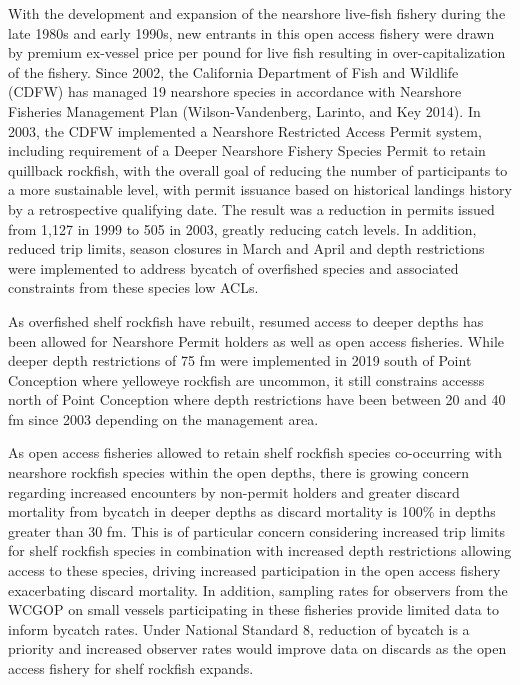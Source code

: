 \documentclass[11pt,
  english,
  a4paper,
]{article}
\begin{document}
With the development and expansion of the nearshore live-fish fishery during the late 1980s and early 1990s, new entrants in this open access fishery were drawn by premium ex-vessel price per pound for live fish resulting in over-capitalization of the fishery. Since 2002, the California Department of Fish and Wildlife (CDFW) has managed 19 nearshore species in accordance with Nearshore Fisheries Management Plan {(Wilson-Vandenberg, Larinto, and Key 2014)\leavevmode\tagmcend\tagstructend}. In 2003, the CDFW implemented a Nearshore Restricted Access Permit system, including requirement of a Deeper Nearshore Fishery Species Permit to retain quillback rockfish, with the overall goal of reducing the number of participants to a more sustainable level, with permit issuance based on historical landings history by a retrospective qualifying date. The result was a reduction in permits issued from 1,127 in 1999 to 505 in 2003, greatly reducing catch levels. In addition, reduced trip limits, season closures in March and April and depth restrictions were implemented to address bycatch of overfished species and associated constraints from these species low ACLs.

\leavevmode\tagmcend\tagstructend\par


As overfished shelf rockfish have rebuilt, resumed access to deeper depths has been allowed for Nearshore Permit holders as well as open access fisheries. While deeper depth restrictions of 75 fm were implemented in 2019 south of Point Conception where yelloweye rockfish are uncommon, it still constrains accesss north of Point Conception where depth restrictions have been between 20 and 40 fm since 2003 depending on the management area.

\leavevmode\tagmcend\tagstructend\par


As open access fisheries allowed to retain shelf rockfish species co-occurring with nearshore rockfish species within the open depths, there is growing concern regarding increased encounters by non-permit holders and greater discard mortality from bycatch in deeper depths as discard mortality is 100\% in depths greater than 30 fm. This is of particular concern considering increased trip limits for shelf rockfish species in combination with increased depth restrictions allowing access to these species, driving increased participation in the open access fishery exacerbating discard mortality. In addition, sampling rates for observers from the WCGOP on small vessels participating in these fisheries provide limited data to inform bycatch rates. Under National Standard 8, reduction of bycatch is a priority and increased observer rates would improve data on discards as the open access fishery for shelf rockfish expands.
\end{document}

